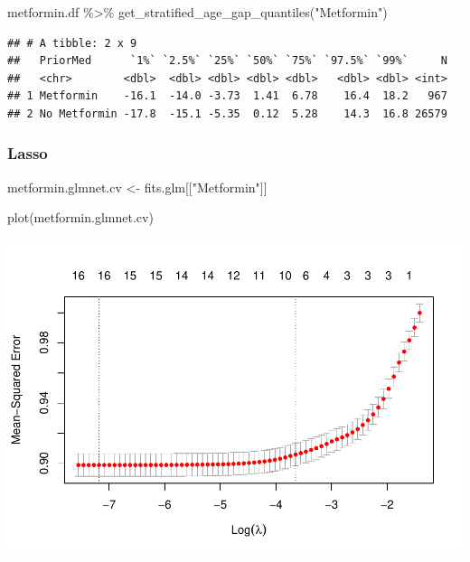 \documentclass[
]{article}
\newenvironment{Shaded}{\begin{snugshade}}{\end{snugshade}}
\newcommand{\FunctionTok}[1]{\textcolor[rgb]{0.00,0.00,0.00}{#1}}
\newcommand{\NormalTok}[1]{#1}
\newcommand{\OtherTok}[1]{\textcolor[rgb]{0.56,0.35,0.01}{#1}}
\newcommand{\SpecialCharTok}[1]{\textcolor[rgb]{0.00,0.00,0.00}{#1}}
\newcommand{\StringTok}[1]{\textcolor[rgb]{0.31,0.60,0.02}{#1}}
\begin{document}
\begin{Shaded}
\begin{Highlighting}[]
\NormalTok{metformin.df }\SpecialCharTok{\%\textgreater{}\%} 
    \FunctionTok{get\_stratified\_age\_gap\_quantiles}\NormalTok{(}\StringTok{"Metformin"}\NormalTok{)}
\end{Highlighting}
\end{Shaded}

\begin{verbatim}
## # A tibble: 2 x 9
##   PriorMed      `1%` `2.5%` `25%` `50%` `75%` `97.5%` `99%`     N
##   <chr>        <dbl>  <dbl> <dbl> <dbl> <dbl>   <dbl> <dbl> <int>
## 1 Metformin    -16.1  -14.0 -3.73  1.41  6.78    16.4  18.2   967
## 2 No Metformin -17.8  -15.1 -5.35  0.12  5.28    14.3  16.8 26579
\end{verbatim}

\hypertarget{lasso-1}{%
\subsubsection{Lasso}\label{lasso-1}}

\begin{Shaded}
\begin{Highlighting}[]
\NormalTok{metformin.glmnet.cv }\OtherTok{\textless{}{-}}\NormalTok{ fits.glm[[}\StringTok{"Metformin"}\NormalTok{]]}
\end{Highlighting}
\end{Shaded}

\begin{Shaded}
\begin{Highlighting}[]
\FunctionTok{plot}\NormalTok{(metformin.glmnet.cv) }
\end{Highlighting}
\end{Shaded}

\includegraphics{../results/report_files/figure-latex/statin-metformin-plot-1.pdf}
\end{document}
